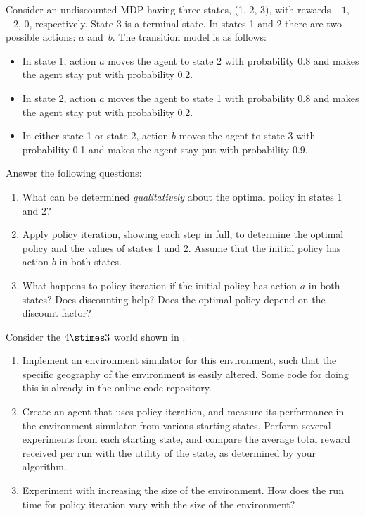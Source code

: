 \begin{exercise}
Consider an undiscounted MDP having three states, (1, 2, 3), with
rewards \(-1\), \(-2\), \(0\), respectively.  State 3 is a terminal state. In
states 1 and 2 there are two possible actions: \(a\) and~\(b\). The
transition model is as follows:
\begin{itemize}
\item In state 1, action \(a\) moves the agent to state 2 with probability 0.8
and makes the agent stay put with probability 0.2.
\item In state 2, action \(a\) moves the agent to state 1 with probability 0.8
and makes the agent stay put with probability 0.2.
\item In either state 1 or state 2, action \(b\) moves the agent to state 3 with
probability 0.1 and makes the agent stay put with probability 0.9.
\end{itemize}
Answer the following questions:
\begin{enumerate}
\item What can be determined {\em qualitatively} about the optimal
policy in states 1 and 2?
\item Apply  policy iteration, showing each step in full,
to determine the optimal policy and the values of states 1 and 2.
Assume that the initial policy has action \(b\) in both states.
\item What happens to policy iteration if the initial policy
has action \(a\) in both states? Does discounting help?
Does the optimal policy depend on the discount factor?
\end{enumerate}
\end{exercise} 

\begin{exercise}
\prgex
Consider the \(4\stimes 3\) world shown in .
\begin{enumerate}
\item Implement an environment simulator for this environment, such
that the specific geography of the environment is easily altered.
Some code for doing this is already in the online code repository.
\item Create an agent that uses policy iteration, and measure its
performance in the environment simulator from various starting
states. Perform several experiments from each starting state, and
compare the average total reward received per run with the utility of
the state, as determined by your algorithm.
\item Experiment with increasing the size of the environment. How does
the run time for policy iteration vary with the size of the environment?
\end{enumerate}
\end{exercise} 


